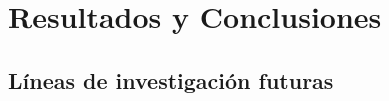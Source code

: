 \documentclass[a4paper, 11pt]{article}
\begin{document}
\clearpage
\thispagestyle{nohead}

\section{Resultados y Conclusiones}


\subsection{Líneas de investigación futuras}


\clearpage
\thispagestyle{nohead}

\end{document}
